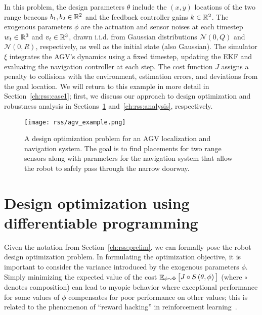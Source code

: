 In this problem, the design parameters $\theta$ include the $(x, y)$ locations of the two range beacons $b_1, b_2 \in \mathbb{R}^2$ and the feedback controller gains $k \in \mathbb{R}^2$. The exogenous parameters $\phi$ are the actuation and sensor noises at each timestep $w_t \in \mathbb{R}^3$ and $v_t \in \mathbb{R}^3$, drawn i.i.d. from Gaussian distributions $\mathcal{N}(0, Q)$ and $\mathcal{N}(0, R)$, respectively, as well as the initial state (also Gaussian). The simulator $\xi$ integrates the AGV's dynamics using a fixed timestep, updating the EKF and evaluating the navigation controller at each step. The cost function $J$ assigns a penalty to collisions with the environment, estimation errors, and deviations from the goal location. We will return to this example in more detail in Section~\ref{ch:rss:case1}; first, we discuss our approach to design optimization and robustness analysis in Sections~\ref{ch:rss:optimization} and~\ref{ch:rss:analysis}, respectively.

\begin{figure}[tb]
    \centering
    \texttt{[image: rss/agv\_example.png]}
    \caption{A design optimization problem for an AGV localization and navigation system. The goal is to find placements for two range sensors along with parameters for the navigation system that allow the robot to safely pass through the narrow doorway.}
    \label{ch:rss:fig:agv_example}
\end{figure}

\section{Design optimization using differentiable programming}\label{ch:rss:optimization}

Given the notation from Section~\ref{ch:rss:prelim}, we can formally pose the robot design optimization problem. In formulating the optimization objective, it is important to consider the variance introduced by the exogenous parameters $\phi$. Simply minimizing the expected value of the cost $\mathop{\mathbb{E}}_{\phi \sim \Phi} \big[ J\circ S\left( \theta, \phi \right) \big]$ (where $\circ$ denotes composition) can lead to myopic behavior where exceptional performance for some values of $\phi$ compensates for poor performance on other values; this is related to the phenomenon of ``reward hacking'' in reinforcement learning~\cite{amodei2016_ai_safety}.

